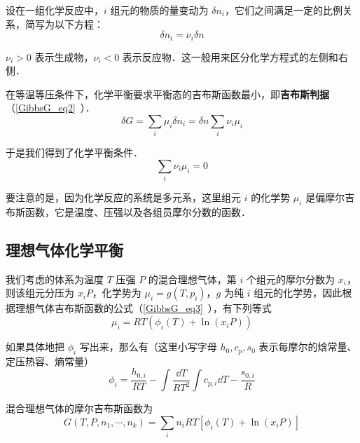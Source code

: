 


设在一组化学反应中，$i$ 组元的物质的量变动为 $\delta n_i$，它们之间满足一定的比例关系，简写为以下方程：
\begin{equation}
\delta n_i=\nu_i \delta n
\end{equation}

$\nu_i>0$ 表示生成物，$\nu_i<0$ 表示反应物．这一般用来区分化学方程式的左侧和右侧．

在等温等压条件下，化学平衡要求平衡态的吉布斯函数最小，即\textbf{吉布斯判据}（\autoref{GibbsG_eq2}~）．
\begin{equation}
\delta G=\sum_i \mu_i\delta n_i=\delta n\sum_i \nu_i\mu_i
\end{equation}

于是我们得到了化学平衡条件．
\begin{equation}\label{ICheEq_eq2}
\sum_i\nu_i\mu_i=0
\end{equation}

要注意的是，因为化学反应的系统是多元系，这里组元 $i$ 的化学势 $\mu_i$ 是偏摩尔吉布斯函数，它是温度、压强以及各组员摩尔分数的函数．

\subsection{理想气体化学平衡}

我们考虑的体系为温度 $T$ 压强 $P$ 的混合理想气体，第 $i$ 个组元的摩尔分数为 $x_i$，则该组元分压为 $x_iP$，化学势为 $\mu_i=g(T,p_i)$，$g$ 为纯 $i$ 组元的化学势，因此根据理想气体吉布斯函数的公式（\autoref{GibbsG_eq3}~），有下列等式
\begin{equation}\label{ICheEq_eq1}
\mu_i=RT(\phi_i(T)+\ln(x_iP))
\end{equation}

如果具体地把 $\phi_i$ 写出来，那么有（这里小写字母 $h_0,c_p,s_0$ 表示每摩尔的焓常量、定压热容、熵常量）
\begin{equation}
\phi_i=\frac{h_{0,i}}{RT}-\int\frac{\dd T}{RT^2}\int c_{p,i}\dd T-\frac{s_{0,i}}{R}
\end{equation}

混合理想气体的摩尔吉布斯函数为
\begin{equation}
G(T,P,n_1,\cdots,n_k)=\sum_i n_iRT[\phi_i(T)+\ln(x_iP)]
\end{equation}

